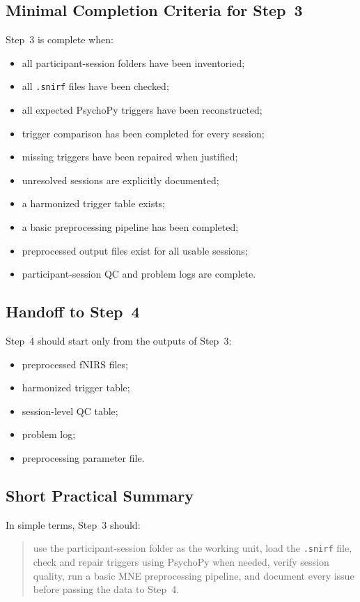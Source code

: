 \subsection{Minimal Completion Criteria for Step~3}
Step~3 is complete when:
\begin{itemize}
    \item all participant-session folders have been inventoried;
    \item all \texttt{.snirf} files have been checked;
    \item all expected PsychoPy triggers have been reconstructed;
    \item trigger comparison has been completed for every session;
    \item missing triggers have been repaired when justified;
    \item unresolved sessions are explicitly documented;
    \item a harmonized trigger table exists;
    \item a basic preprocessing pipeline has been completed;
    \item preprocessed output files exist for all usable sessions;
    \item participant-session QC and problem logs are complete.
\end{itemize}

\subsection{Handoff to Step~4}
Step~4 should start only from the outputs of Step~3:
\begin{itemize}
    \item preprocessed fNIRS files;
    \item harmonized trigger table;
    \item session-level QC table;
    \item problem log;
    \item preprocessing parameter file.
\end{itemize}

\subsection{Short Practical Summary}
In simple terms, Step~3 should:
\begin{quote}
use the participant-session folder as the working unit, load the \texttt{.snirf} file,
check and repair triggers using PsychoPy when needed, verify session quality, run a basic
MNE preprocessing pipeline, and document every issue before passing the data to Step~4.
\end{quote}
